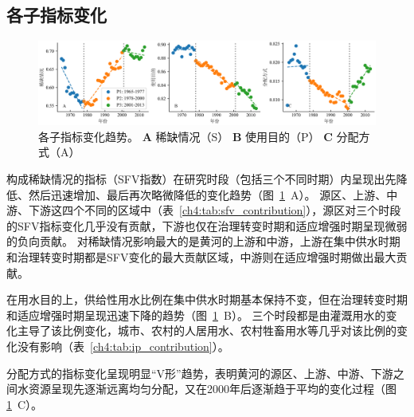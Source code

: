 \subsection{各子指标变化}

\begin{figure}[!ht]
  \centering
  \includegraphics[width=\textwidth]{img/ch4/ch4_indicators.png}
  \caption[各子指标变化趋势]{
	各子指标变化趋势。
	\textbf{A} 稀缺情况（S）
	\textbf{B} 使用目的（P）
	\textbf{C} 分配方式（A）
}\label{ch4:fig:indicators}
\end{figure}


构成稀缺情况的指标（SFV指数）在研究时段（包括三个不同时期）内呈现出先降低、然后迅速增加、最后再次略微降低的变化趋势（图~\ref{ch4:fig:indicators}~A）。
源区、上游、中游、下游这四个不同的区域中（表~\ref{ch4:tab:sfv_contribution}），源区对三个时段的SFV指标变化几乎没有贡献，下游也仅在治理转变时期和适应增强时期呈现微弱的负向贡献。
对稀缺情况影响最大的是黄河的上游和中游，上游在集中供水时期和治理转变时期都是SFV变化的最大贡献区域，中游则在适应增强时期做出最大贡献。



在用水目的上，供给性用水比例在集中供水时期基本保持不变，但在治理转变时期和适应增强时期呈现迅速下降的趋势（图~\ref{ch4:fig:indicators}~B）。
三个时段都是由灌溉用水的变化主导了该比例变化，城市、农村的人居用水、农村牲畜用水等几乎对该比例的变化没有影响（表~\ref{ch4:tab:ip_contribution}）。



分配方式的指标变化呈现明显“V形”趋势，表明黄河的源区、上游、中游、下游之间水资源呈现先逐渐远离均匀分配，又在2000年后逐渐趋于平均的变化过程（图\ref{ch4:fig:indicators}~C）。
